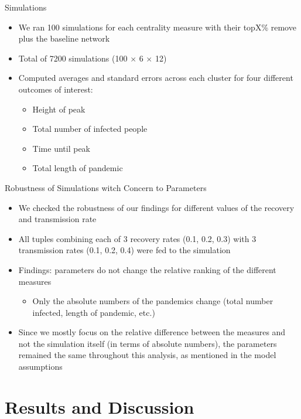 \documentclass[10pt]{beamer}
\begin{document}
\begin{frame}{Simulations}
\begin{itemize}
\item We ran 100 simulations for each centrality measure with their topX\% remove plus the baseline network
\item Total of 7200 simulations (100 $\times$ 6 $\times$ 12)
\item Computed averages and standard errors across each cluster for four different outcomes of interest:
\begin{itemize}
     \item Height of peak
     \item Total number of infected people
     \item Time until peak
     \item Total length of pandemic
     \end{itemize}
 \end{itemize}
\end{frame}

\begin{frame}{Robustness of Simulations witch Concern to Parameters}
\begin{itemize}
\item We checked the robustness of our findings for different values of the recovery and transmission rate 
\item All tuples combining each of 3 recovery rates (0.1, 0.2, 0.3) with 3 transmission rates (0.1, 0.2, 0.4) were fed to the simulation
\item Findings: parameters do not change the relative ranking of the different measures
\begin{itemize}
     \item Only the absolute numbers of the pandemics change (total number infected, length of pandemic, etc.)
     \end{itemize}

\item Since we mostly focus on the relative difference between the measures and not the simulation itself (in terms of absolute numbers), the parameters remained the same throughout this analysis, as mentioned in the model assumptions

 \end{itemize}
\end{frame}



\section{Results and Discussion}
\end{document}
